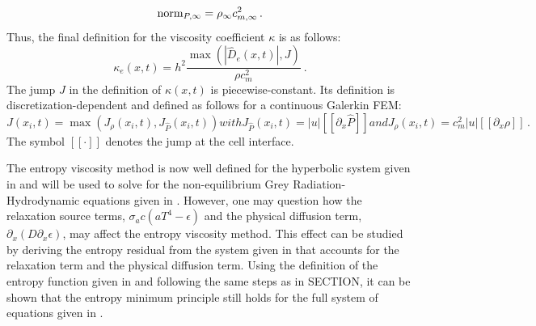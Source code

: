\documentclass[review]{elsarticle}
\begin{document}
%
\begin{equation}
\textrm{norm}_{P,\infty} = \rho_\infty c^2_{m,\infty} \nonumber \,.
\end{equation}
%
Thus, the final definition for the viscosity coefficient $\kappa$ is as follows:
\begin{equation}
\label{eq:equation12bis}
\kappa_e(x,t) = h^2 \frac{\max (|\hat{D}_e(x,t)|, J)}{\rho c_m^2} \ .
\end{equation} 
%
The jump $J$ in the definition of $\kappa(x,t)$ is piecewise-constant. Its definition is discretization-dependent and defined as follows for a continuous Galerkin FEM: 
\begin{subequations}
\label{eq:equation12ter}
\begin{equation}
J(x_i,t) = \max( J_{\rho}(x_i,t), J_{\hat{P}}(x_i,t) )
\end{equation}
with
\begin{equation}
J_{\hat{P}}(x_i,t) = |u| [[\partial_x \hat{P}]]
\end{equation}
and
\begin{equation}
J_{\rho}(x_i,t) = c_m^2 |u|  [[\partial_x \rho]] \,.
\end{equation}
\end{subequations}
The symbol $[[ \cdot ]]$ denotes the jump at the cell interface.

The entropy viscosity method is now well defined for the hyperbolic system given in  and will be used to solve for the non-equilibrium Grey Radiation-Hydrodynamic equations given in . However, one may question how the relaxation source terms, $\sigma_a c (a T^4-\epsilon)$ and the physical diffusion term, $\partial_x(D\partial_x \epsilon)$, may affect the entropy viscosity method. This effect can be studied by deriving the entropy residual from the system given in  that accounts for the relaxation term and the physical diffusion term. Using the definition of the entropy function given in  and following the same steps as in SECTION, it can be shown that the entropy minimum principle still holds for the full system of equations given in .
\end{document}

